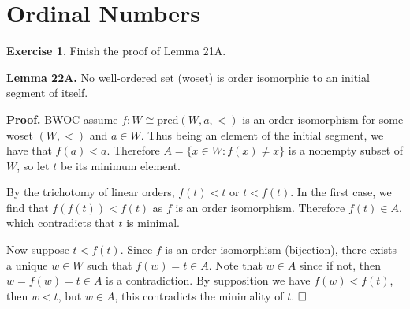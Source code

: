 \documentclass{article}
\theoremstyle{definition}
\newtheorem{exercise}{Exercise}[section]
\newcommand{\so}{\text{\textbf{Solution: }}}
\newcommand{\es}{$\hfill \square$}
\begin{document}
\section{Ordinal Numbers}
    \begin{exercise}
        Finish the proof of Lemma 21A. 
        
        \noindent\so \textbf{Lemma 22A.} No well-ordered set (woset) is order isomorphic to an initial segment of itself.
        
        \noindent \textbf{Proof.} BWOC assume \( f : W \cong \mathrm{pred}(W, a, <) \) is an order isomorphism for some woset \( (W, <) \) and \( a \in W \). Thus being an element of the initial segment, we have that \( f(a) < a \). Therefore \( A = \{ x \in W : f(x) \neq x \} \) is a nonempty subset of \( W \), so let \( t \) be its minimum element.

        By the trichotomy of linear orders, \( f(t) < t \) or \( t < f(t) \). In the first case, we find that \( f(f(t)) < f(t) \) as \( f \) is an order isomorphism. Therefore \( f(t) \in A \), which contradicts that \( t \) is minimal.

        Now suppose  \( t < f(t) \). Since $f$ is an order isomorphism (bijection), there exists a unique $w \in W$ such that $f(w) = t \in A$. Note that $w \in A$ since if not, then $w = f(w) = t \in A$ is a contradiction. By supposition we have $f(w) < f(t)$, then $w < t$, but $w \in A$, this contradicts the minimality of $t$. \es
    \end{exercise}
\end{document}

